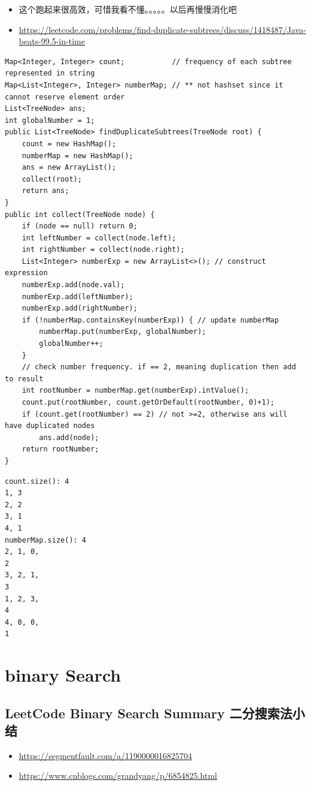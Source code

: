 \documentclass[9pt, b5paaper]{book}
\begin{document}
\begin{itemize}
\item 这个跑起来很高效，可惜我看不懂。。。。。以后再慢慢消化吧
\item \url{https://leetcode.com/problems/find-duplicate-subtrees/discuss/1418487/Java-beats-99.5-in-time}
\end{itemize}
\begin{verbatim}
Map<Integer, Integer> count;           // frequency of each subtree represented in string
Map<List<Integer>, Integer> numberMap; // ** not hashset since it cannot reserve element order
List<TreeNode> ans;
int globalNumber = 1;
public List<TreeNode> findDuplicateSubtrees(TreeNode root) {
    count = new HashMap();
    numberMap = new HashMap();
    ans = new ArrayList();
    collect(root);
    return ans;
}
public int collect(TreeNode node) {
    if (node == null) return 0;
    int leftNumber = collect(node.left);
    int rightNumber = collect(node.right);
    List<Integer> numberExp = new ArrayList<>(); // construct expression
    numberExp.add(node.val);
    numberExp.add(leftNumber);
    numberExp.add(rightNumber);
    if (!numberMap.containsKey(numberExp)) { // update numberMap
        numberMap.put(numberExp, globalNumber);
        globalNumber++;
    }
    // check number frequency. if == 2, meaning duplication then add to result
    int rootNumber = numberMap.get(numberExp).intValue();
    count.put(rootNumber, count.getOrDefault(rootNumber, 0)+1);
    if (count.get(rootNumber) == 2) // not >=2, otherwise ans will have duplicated nodes
        ans.add(node);
    return rootNumber;
}
\end{verbatim}
\begin{verbatim}
count.size(): 4
1, 3
2, 2
3, 1
4, 1
numberMap.size(): 4
2, 1, 0,
2
3, 2, 1,
3
1, 2, 3,
4
4, 0, 0,
1
\end{verbatim}

\chapter{binary Search}
\label{sec-5}
\section{LeetCode Binary Search Summary 二分搜索法小结}
\label{sec-5-1}
\begin{itemize}
\item \url{https://segmentfault.com/a/1190000016825704}
\item \url{https://www.cnblogs.com/grandyang/p/6854825.html}
\end{itemize}
\end{document}
